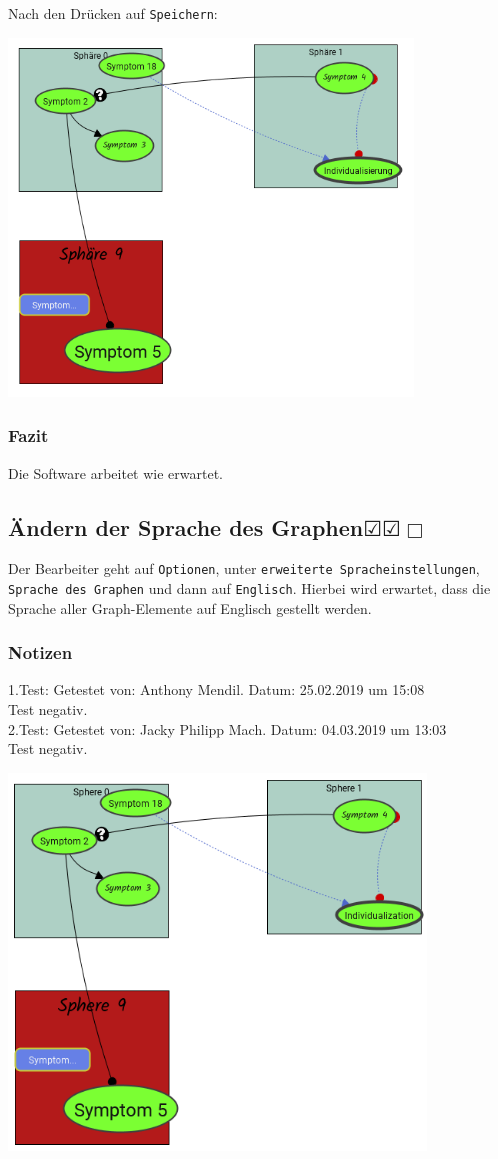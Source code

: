 \documentclass[enabledeprecatedfontcommands]{scrartcl}
\newcommand{\subsectiont}[2]{\subsection[#1]{#1{\normalsize\normalfont #2}}}
\newcommand{\leer}{$\Box$}
\newcommand{\ok}{$\CheckedBox$}
\begin{document}
Nach den Drücken auf \texttt{Speichern}:
\begin{center}
\includegraphics[height=9.5cm]{3_44speichern.PNG}
\end{center}
\subsubsection{Fazit}
Die Software arbeitet wie erwartet.

\subsectiont{Ändern der Sprache des Graphen}{\dotfill\ok\ok\leer}
Der Bearbeiter geht auf \texttt{Optionen}, unter \texttt{erweiterte Spracheinstellungen}, \texttt{Sprache des Graphen} und dann auf \texttt{Englisch}. Hierbei wird erwartet, dass die Sprache aller Graph-Elemente auf Englisch gestellt werden.
\subsubsection{Notizen}
1.Test: Getestet von: Anthony Mendil. Datum: 25.02.2019 um 15:08 \\
Test negativ. \\
2.Test: Getestet von: Jacky Philipp Mach. Datum: 04.03.2019 um 13:03 \\
Test negativ.
\begin{center}
\includegraphics[height=10cm]{3_45.PNG}
\end{center}
\end{document}
